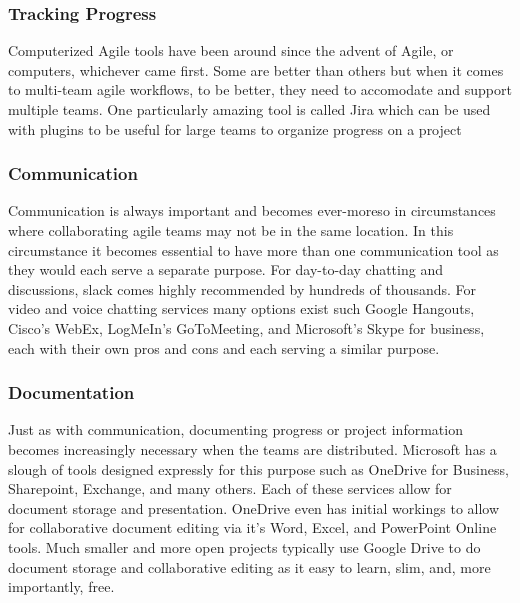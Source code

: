 \documentclass[sigplan,screen]{acmart}
\begin{document}
\subsubsection{Tracking Progress}
Computerized Agile tools have been around since the advent of Agile, or computers, whichever came first. Some are better than others but when it comes to multi-team agile workflows, to be better, they need to accomodate and support multiple teams. One particularly amazing tool is called Jira which can be used with plugins to be useful for large teams to organize progress on a project

\subsubsection{Communication}
Communication is always important and becomes ever-moreso in circumstances where collaborating agile teams may not be in the same location. In this circumstance it becomes essential to have more than one communication tool as they would each serve a separate purpose. For day-to-day chatting and discussions, slack comes highly recommended by hundreds of thousands. For video and voice chatting services many options exist such Google Hangouts, Cisco's WebEx, LogMeIn's GoToMeeting, and Microsoft's Skype for business, each with their own pros and cons and each serving a similar purpose.

\subsubsection{Documentation}
Just as with communication, documenting progress or project information becomes increasingly necessary when the teams are distributed. Microsoft has a slough of tools designed expressly for this purpose such as OneDrive for Business, Sharepoint, Exchange, and many others. Each of these services allow for document storage and presentation. OneDrive even has initial workings to allow for collaborative document editing via it's Word, Excel, and PowerPoint Online tools. Much smaller and more open projects typically use Google Drive to do document storage and collaborative editing as it easy to learn, slim, and, more importantly, free.
\end{document}
